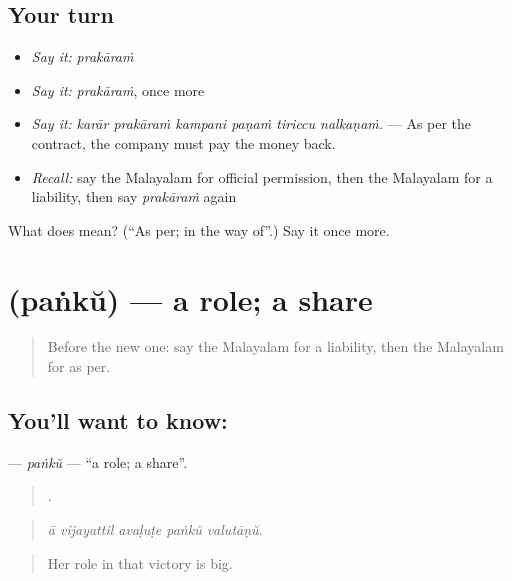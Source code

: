 \subsection*{Your turn}
\begin{itemize}
\raggedright
  \item \emph{Say it:} \emph{prakāraṁ}
  \item \emph{Say it:} \emph{prakāraṁ}, once more
  \item \emph{Say it:} \emph{karār prakāraṁ kampani paṇaṁ tiriccu nalkaṇaṁ.} — As per the contract, the company must pay the money back.
  \item \emph{Recall:} say the Malayalam for official permission, then the Malayalam for a liability, then say \emph{prakāraṁ} again
\end{itemize}

\begin{tcolorbox}[breakable,colback=teal!4,colframe=teal!35!black,title={Before you move on}]
What does  mean? (\textquotedblleft{}As per; in the way of\textquotedblright{}.) Say it once more.
\end{tcolorbox}
\section[\texorpdfstring{\ml{പങ്ക്} (paṅkŭ)}{പങ്ക് (paṅkŭ)}]{ (paṅkŭ) — a role; a share}

\label{lesson:ML-C444-panku}



\begin{quote}
Before the new one: say the Malayalam for a liability, then the Malayalam for as per.
\end{quote}

\subsection*{You'll want to know: }
\textbf{} — \emph{paṅkŭ} — \textquotedblleft{}a role; a share\textquotedblright{}.

\begin{quote}
    .
\end{quote}

\begin{quote}
\emph{ā vijayattil avaḷuṭe paṅkŭ valutāṇŭ.}
\end{quote}

\begin{quote}
Her role in that victory is big.
\end{quote}

